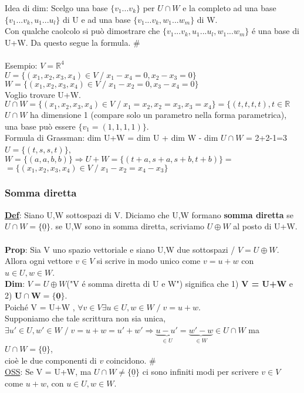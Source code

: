 \documentclass[12pt]{article}
\begin{document}
\noindent Idea di dim: Scelgo una base $\{v_1...v_k\}$ per $U\cap W$ e la completo ad una base $\{v_1...v_k,u_1...u_l\}$ di U e ad una base $\{v_1...v_k,w_1...w_m\}$ di W.\\
Con qualche caolcolo si può dimostrare che $\{v_1...v_k,u_1...u_l,w_1...w_m\}$ é una base di U+W. Da questo segue la formula. $\#$\\\\
Esempio: $V=\mathbb{R}^4$\\
$U=\{(x_1,x_2,x_3,x_4)\in V\;/\; x_1-x_4 = 0,x_2-x_3 = 0\}$\\ $W=\{(x_1,x_2,x_3,x_4)\in V \;/\; x_1-x_2 = 0, x_3-x_4 = 0\}$\\
Voglio trovare U+W.\\
$U\cap W = \{(x_1,x_2,x_3,x_4) \in V \;/\; x_1 = x_2, x_2=x_3, x_3 = x_4\} = \{(t,t,t,t), t\in \mathbb{R}$\\
$U\cap W$ ha dimensione 1 (compare solo un parametro nella forma parametrica), una base può essere $\{v_1=(1,1,1,1)\}$.\\
Formula di Grassman: dim U+W = dim U + dim W - dim $U\cap W$ = 2+2-1=3\\
$U =\{(t,s,s,t)\}$, $W=\{(a,a,b,b)\} \Longrightarrow U+W = \{(t+a,s+a,s+b,t+b)\} = $\\
$=\{(x_1,x_2,x_3,x_4)\in V\;/\; x_1-x_2=x_4-x_3\}$
\subsubsection{Somma diretta}
\textbf{\underline{Def}}: Siano U,W sottospazi di V. Diciamo che U,W formano \textbf{somma diretta} se $U\cap W = \{\underline{0}\}$. se U,W sono in somma diretta, scriviamo $U\oplus W$ al posto di U+W.\\\\
\textbf{Prop}: Sia V uno spazio vettoriale e siano U,W due sottospazi / $V=U\oplus W$.\\ Allora ogni vettore $v\in V$ si scrive in modo unico come $v = u+w$ con $u\in U, w\in W$.\\
\textbf{Dim}: $V=U\oplus W$("V é somma diretta di U e W") significa che 1) \textbf{V = U+W} e 2) $\boldsymbol{U \cap W = \{\underline{0}\}}$.\\ Poiché V = U+W , $\forall v \in V \exists u\in U , w\in W \;/\; v = u+w$.\\
Supponiamo che tale scrittura non sia unica, $\exists u' \in U, w' \in W \;/\; v = u+w=u'+w' \Longrightarrow \underbrace{u-u'}_{\in U}=\underbrace{w'-w}_{\in W}\in U\cap W$ ma $U\cap W = \{\underline{0}\}$,\\ cioè le due componenti di $v$ coincidono. \#\\
\underline{OSS}: Se V = U+W, ma $U\cap W \neq \{\underline{0}\}$ ci sono infiniti modi per scrivere $v\in V$ come $u+w$, con $u \in U, w\in W$.
\end{document}
